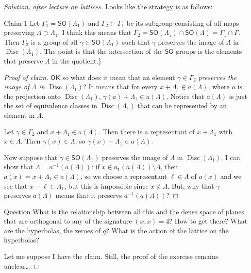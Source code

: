 \begin{proof}[Solution, after lecture on lattices]\leavevmode
	Looks like the strategy is as follows:
	\begin{idea4}{Claim 1}\leavevmode
		Let $\Gamma_1=\mathsf{SO}(\Lambda_1)$ and $\Gamma_2 \subset\Gamma_1$ be its subgroup consisting of all maps preserving $\Lambda\supset\Lambda_1$. {\color{3}I think this means that $\Gamma_2=\mathsf{SO}(\Lambda_1) \cap \mathsf{SO}(\Lambda)=\Gamma_1\cap \Gamma$.} Then $\Gamma_2$ is a group of all $\gamma\in\mathsf{SO}(\Lambda_1)$ such that $\gamma$ preserves the image of $\Lambda$ in $\operatorname{Disc}(\Lambda_1)$. {\color{8}The point is that the intersection of the $\mathsf{SO}$ groups is the elements that preserve $\Lambda$ in the quotient.\}}
	\end{idea4}
	\begin{proof}[Proof of claim]\leavevmode
		$\mathsf{OK}$ so what does it mean that an element $\gamma\in \Gamma_2$ \textit{preserves the image of $\Lambda$ in $\operatorname{Disc}(\Lambda_1)$}? It means that for every $x+\Lambda_1\in a(\Lambda)$, where $a$ is the projection onto  $\operatorname{Disc}(\Lambda_1)$, $\gamma(a)+\Lambda_1\in a(\Lambda)$. Notice that $a(\Lambda)$ is just the set of equivalence classes in $\operatorname{Disc}(\Lambda_1)$ that can be represented by an element in $\Lambda$.

		Let $\gamma\in\Gamma_2 $ and $x +\Lambda_1\in a(\Lambda)$. Then there is a representant of $x +\Lambda_1$ with $x\in\Lambda$. Then $\gamma(x)\in\Lambda$, so $\gamma(x)+\Lambda_1\in a(\Lambda)$.

 		Now suppose that $\gamma\in\mathsf{SO}(\Lambda_1)$ preserves the image of $\Lambda$ in $\operatorname{Disc}(\Lambda_1)$. I can show that $\Lambda=a^{-1}(a(\Lambda))$: if $x\in a_1(a(\Lambda))\setminus \Lambda$, then $a(x)=x+\Lambda_1\in a(\Lambda)$, so we choose a representant $\ell\in\Lambda$ of $a(x)$ and we see that  $x-\ell\in\Lambda_1$, but this is impossible since $x \not\in\Lambda$. But, {\color{8}why that $\gamma$ preserves $a(\Lambda)$ means that it preservs $a^{-1}(a(\Lambda))$?}

	\end{proof}
	\begin{idea8}{Question}\leavevmode
		What is the relationship between all this and the dense space of planes that are orthogonal to any of the signature $(x,x)=4$? How to get there? What are the hyperbolas, the zeroes of  $q$? What is the action of the lattice on the hyperbolas?
	\end{idea8}

	Let me suppose I have the claim. Still, the proof of the exercise remains unclear…
\end{proof}

